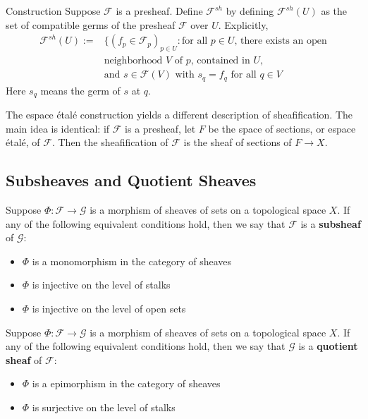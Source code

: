 \begin{rmk}{Construction}
    Suppose $\mathscr{F}$ is a presheaf. Define $\mathscr{F}^{sh}$ by defining $\mathscr{F}^{sh}(U)$ as the set of compatible germs of the presheaf $\mathscr{F}$ over $U$. Explicitly, \begin{align*}
        \mathscr{F}^{sh}(U) := &\Bigg\{(f_p \in \mathscr{F}_p)_{p \in U}:\text{for all }p \in U\text{, there exists an open} \\
        &\text{neighborhood $V$ of $p$, contained in $U$,} \\
        &\text{and $s \in \mathscr{F}(V)$ with $s_q = f_q$ for all $q \in V$} 
    \end{align*}
    Here $s_q$ means the germ of $s$ at $q$.
\end{rmk}

\begin{rmk}
    The espace \'{e}tal\'{e} construction yields a different description of sheafification. The main idea is identical: if $\mathscr{F}$ is a presheaf, let $F$ be the space of sections, or espace \'{e}tal\'{e}, of $\mathscr{F}$. Then the sheafification of $\mathscr{F}$ is the sheaf of sections of $F\rightarrow X$.
\end{rmk}

\subsection{Subsheaves and Quotient Sheaves}

\begin{definition}
    Suppose $\Phi:\mathscr{F}\rightarrow \mathscr{G}$ is a morphism of sheaves of sets on a topological space $X$. If any of the following equivalent conditions hold, then we say that $\mathscr{F}$ is a \textbf{subsheaf} of $\mathscr{G}$: \begin{itemize}
        \item $\Phi$ is a monomorphism in the category of sheaves
        \item $\Phi$ is injective on the level of stalks
        \item $\Phi$ is injective on the level of open sets
    \end{itemize}
\end{definition}

\begin{definition}
    Suppose $\Phi:\mathscr{F}\rightarrow \mathscr{G}$ is a morphism of sheaves of sets on a topological space $X$. If any of the following equivalent conditions hold, then we say that $\mathscr{G}$ is a \textbf{quotient sheaf} of $\mathscr{F}$: \begin{itemize}
        \item $\Phi$ is a epimorphism in the category of sheaves
        \item $\Phi$ is surjective on the level of stalks
    \end{itemize}
\end{definition}


